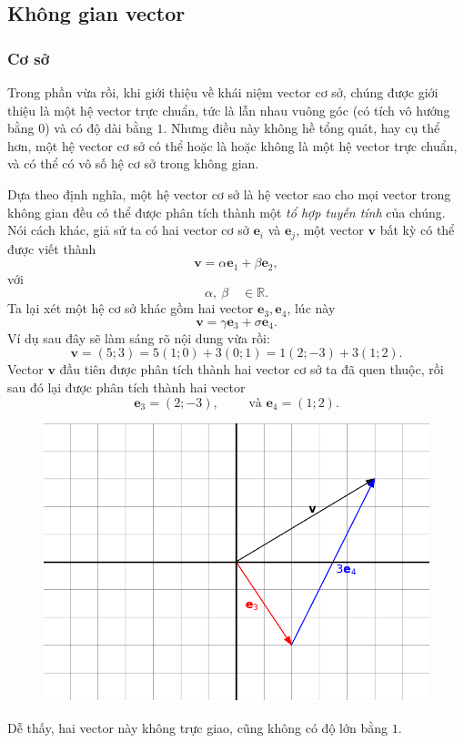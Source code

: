 \subsection{Không gian vector}
\subsubsection*{Cơ sở}
Trong phần vừa rồi, khi giới thiệu về khái niệm vector cơ sở, chúng được giới thiệu là một hệ vector trực chuẩn, tức là lẫn nhau vuông góc (có tích vô hướng bằng \(0\)) và có độ dài bằng \(1\).
Nhưng điều này không hề tổng quát, hay cụ thể hơn, một hệ vector cơ sở có thể hoặc là hoặc không là một hệ vector trực chuẩn, và có thể có vô số hệ cơ sở trong không gian. 
\vspace{5pt}

Dựa theo định nghĩa, một hệ vector cơ sở là hệ vector sao cho mọi vector trong không gian đều có thể được phân tích thành một \emph{tổ hợp tuyến tính} của chúng. Nói cách khác, giả sử ta có hai vector cơ sở \(\mathbf{e}_i\) và \(\mathbf{e}_j\), một vector \(\mathbf{v}\) bất kỳ có thể được viết thành \[\mathbf{v}=\alpha\mathbf{e}_1 +\beta\mathbf{e}_2,\] với \[\alpha,~\beta \quad \in\mathbb{R}.\] Ta lại xét một hệ cơ sở khác gồm hai vector \(\mathbf{e}_{3}, \mathbf{e}_4\), lúc này \[\mathbf{v}=\gamma\mathbf{e}_3 +\sigma\mathbf{e}_4.\]
Ví dụ sau đây sẽ làm sáng rõ nội dung vừa rồi: 
\[\mathbf{v}= (5;3)=5(1;0)+3(0;1)=1(2;-3)
+3(1;2).\] Vector \(\mathbf{v}\) đầu tiên được phân tích thành hai vector cơ sở ta đã quen thuộc, rồi sau đó lại được phân tích thành hai vector \[
\mathbf{e}_3 =(2;-3),\qquad \text{ và } \mathbf{e}_4 =(1;2).\] 
\begin{figure}[H]
    \centering
    \includegraphics[width=0.8\linewidth]{Tuan2/Figures/e3e4.png}
\end{figure}
Dễ thấy, hai vector này không trực giao, cũng không có độ lớn bằng \(1\). 

